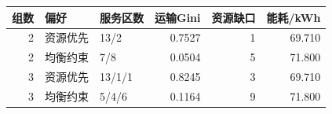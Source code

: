 \begin{tabular}{rllrrr}
\toprule
组数 & 偏好 & 服务区数 & 运输Gini & 资源缺口 & 能耗/kWh \\
\midrule
2 & 资源优先 & 13/2 & 0.7527 & 1 & 69.710 \\
2 & 均衡约束 & 7/8 & 0.0504 & 5 & 71.800 \\
3 & 资源优先 & 13/1/1 & 0.8245 & 3 & 69.710 \\
3 & 均衡约束 & 5/4/6 & 0.1164 & 9 & 71.800 \\
\bottomrule
\end{tabular}
